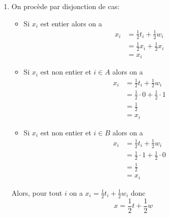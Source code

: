 {\begin{td-sol}[]
\begin{enumerate}
			\begin{enumerate}
				\item On procède par disjonction de cas:
				\begin{itemize}
					\item Si \(x_i\) est entier alors on a
					\begin{equation*}
						\begin{aligned}
							x_i 
							&= \frac{1}{2} t_i + \frac{1}{2} w_i\\
							&= \frac{1}{2} x_i + \frac{1}{2} x_i\\
							&= x_i
						\end{aligned}
					\end{equation*}
					\item Si \(x_i\) est non entier et \(i\in A\) alors on a
					\begin{equation*}
						\begin{aligned}
							x_i 
							&= \frac{1}{2} t_i + \frac{1}{2} w_i\\
							&= \frac{1}{2} \cdot 0 + \frac{1}{2} \cdot 1\\
							&= \frac{1}{2}\\
							&= x_i
						\end{aligned}
					\end{equation*}
					\item Si \(x_i\) est non entier et \(i\in B\) alors on a
					\begin{equation*}
						\begin{aligned}
							x_i 
							&= \frac{1}{2} t_i + \frac{1}{2} w_i\\
							&= \frac{1}{2} \cdot 1 + \frac{1}{2} \cdot 0\\
							&= \frac{1}{2}\\
							&= x_i
						\end{aligned}
					\end{equation*}
				\end{itemize}
				Alors, pour tout \(i\) on a \(x_i = \frac{1}{2} t_i + \frac{1}{2} w_i\) donc
				\begin{equation*}
					x = \frac{1}{2} t + \frac{1}{2} w
				\end{equation*}


\end{enumerate}
\end{enumerate}
\end{td-sol}}

